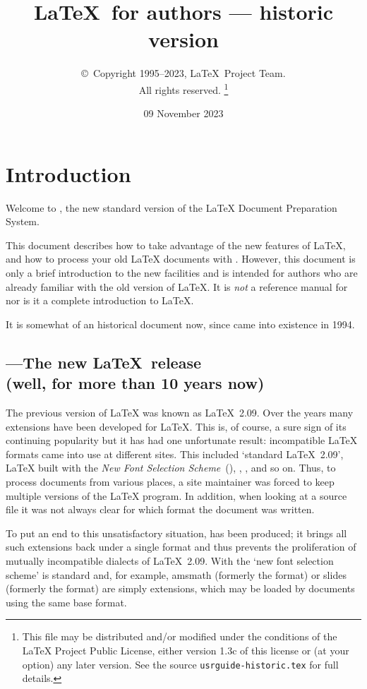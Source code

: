 \documentclass{ltxguide}[2001/05/28]
\title{\LaTeX\ for authors --- historic version}
\author{\copyright~Copyright 1995--2023, \LaTeX\ Project Team.\\
   All rights reserved.%
   \footnote{This file may be distributed and/or modified under the
     conditions of the \LaTeX{} Project Public License, either version 1.3c
     of this license or (at your option) any later version. See the source
    \texttt{usrguide-historic.tex} for full details.}%
}
\date{09 November 2023}
\begin{document}
\maketitle

\tableofcontents

\section{Introduction}

Welcome to \LaTeXe, the new standard version of the \LaTeX{} Document
Preparation System.

This document describes how to take advantage of the new features of
\LaTeX, and how to process your old \LaTeX{} documents with
\LaTeXe. However, this document is only a brief introduction to the
new facilities and is intended for authors who are already familiar
with the old version of \LaTeX{}.  It is \emph{not} a reference manual
for \LaTeXe{} nor is it a complete introduction to \LaTeX.

It is somewhat of an historical document now, since \LaTeXe{} came into
existence in 1994.

\subsection[\LaTeXe---The new \LaTeX~release]
  {\LaTeXe---The new \LaTeX~release\\ (well, for more than 10 years now)}

The previous version of \LaTeX{} was known as \LaTeX~2.09.  Over the
years many extensions have been developed for \LaTeX.  This is, of
course, a sure sign of its continuing popularity but it has had one
unfortunate result: incompatible \LaTeX{} formats came into use at
different sites.  This included `standard \LaTeX~2.09', \LaTeX{} built
with the \emph{New Font Selection Scheme}~(\NFSS), \SLiTeX, \AmSLaTeX,
and so on.  Thus, to process documents from various places, a site
maintainer was forced to keep multiple versions of the \LaTeX{}
program.  In addition, when looking at a source file it was not always
clear for which format the document was written.

To put an end to this unsatisfactory situation, \LaTeXe{} has been
produced; it brings all such extensions back under a single format and
thus prevents the proliferation of mutually incompatible dialects of
\LaTeX~2.09.  With \LaTeXe{} the `new font selection scheme' is
standard and, for example, \textsf{amsmath} (formerly the \AmSLaTeX{}
format) or \textsf{slides} (formerly the \SLiTeX{} format) are simply
extensions, which may be loaded by documents using the same base format.
\end{document}
